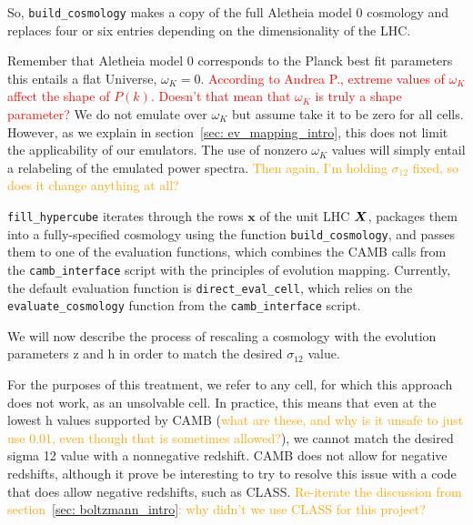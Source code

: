 So, \verb|build_cosmology| makes a copy of the full Aletheia model 0 cosmology 
and replaces four or six entries depending on the dimensionality of the LHC. 


Remember that Aletheia model 0 corresponds to the Planck best fit parameters
this entails a flat Universe, $\omega_K = 0$.
\textcolor{red}{According to Andrea P., extreme values of $\omega_K$
affect the shape of $P(k)$. Doesn't that mean that $\omega_K$ is truly a
shape parameter?} We do not emulate over $\omega_K$ but assume take
it to be zero for all cells. However, as we explain in
section~\ref{sec: ev_mapping_intro}, this does not limit the applicability of
our emulators. The use of nonzero $\omega_K$ values will simply entail a
relabeling of the emulated power spectra. \textcolor{orange}{Then again, I'm
holding $\sigma_{12}$ fixed, so does it change anything at all?}


\verb|fill_hypercube| iterates through the rows $\bm{x}$ of the unit LHC
$\bm{X}$, packages them into a fully-specified cosmology using the function
\verb|build_cosmology|, and passes them to one of the evaluation functions,
which combines the CAMB calls from the \verb|camb_interface| script with the
principles of evolution mapping. Currently, the default evaluation function is
\verb|direct_eval_cell|, which relies on the \verb|evaluate_cosmology|
function from the \verb|camb_interface| script.

% 


We will now describe the process of rescaling a cosmology with the evolution 
parameters z and h in order to match the desired $\sigma_{12}$ value.

For the purposes of this treatment, we refer to any cell, for which this 
approach does not work, as an unsolvable cell. In practice, this means that 
even at the lowest h values supported by CAMB (\textcolor{orange}{what are 
these, and why is it unsafe to just use 0.01, even though that is sometimes 
allowed?}), we cannot match the desired sigma 12 value with a nonnegative 
redshift. CAMB does not allow for negative redshifts, although it prove be 
interesting to try to resolve this issue with a code that does allow negative 
redshifts, such as CLASS. \textcolor{orange}{Re-iterate the discussion from
section~\ref{sec: boltzmann_intro}: why didn’t we use CLASS for this project?}

